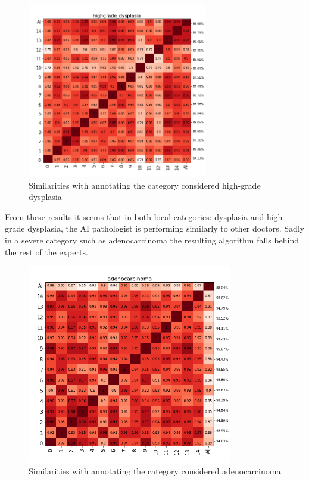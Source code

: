 \documentclass[a4paper,12pt]{article}
\begin{document}
\begin{figure}[H]
    \centering
    \includegraphics[width=0.7\textwidth]{results/similarities_highgrade_dysplasia.png}
    \caption{Similarities with annotating the category considered high-grade dysplasia}
    \label{fig:sim_highgradedysp}
\end{figure}

\vspace{4mm}

\par From these results it seems that in both local categories: dysplasia and high-grade dysplasia, the AI pathologist is performing similarly to other doctors. Sadly in a severe category such as adenocarcinoma the resulting algorithm falls behind the rest of the experts.

\begin{figure}[H]
    \centering
    \includegraphics[width=0.8\textwidth]{results/similarities_adenocarcinoma.png}
    \caption{Similarities with annotating the category considered adenocarcinoma}
    \label{fig:sim_adeno}
\end{figure}
\end{document}
